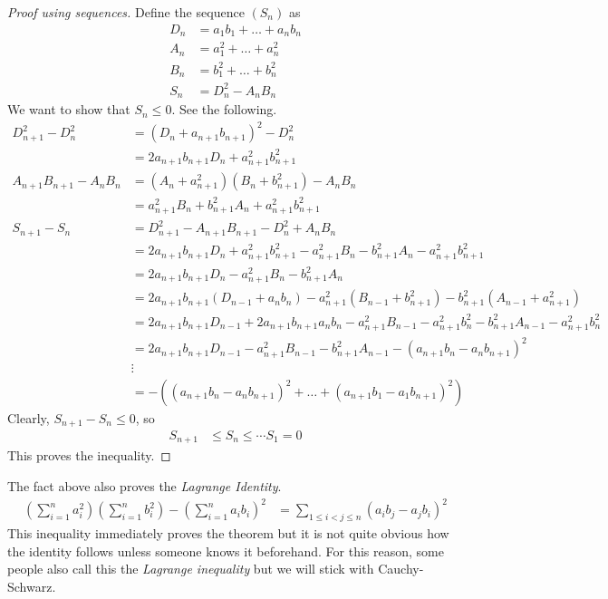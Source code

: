 \documentclass{subfile}
\begin{document}
		\begin{proof}[Proof using sequences]
			Define the sequence $(S_n)$ as
				\begin{align*}
					D_n
						& = a_1b_1+\ldots+a_nb_n\\
					A_n
						& = a_1^2+\ldots+a_n^2\\
					B_n
						& = b_1^2+\ldots+b_n^2\\
					S_n
						& = D_n^2-A_nB_n
				\end{align*}
			We want to show that $S_n\leq0$. See the following.
				\begin{align*}
					D_{n+1}^2-D_n^2
						& = (D_n+a_{n+1}b_{n+1})^2-D_n^2\\
						& = 2a_{n+1}b_{n+1}D_n+a_{n+1}^2b_{n+1}^2\\
					A_{n+1}B_{n+1}-A_nB_n
						& = (A_n+a_{n+1}^2)(B_n+b_{n+1}^2)-A_nB_n\\
						& = a_{n+1}^2B_n+b_{n+1}^2A_n+a_{n+1}^2b_{n+1}^2\\
					S_{n+1}-S_n
						& = D_{n+1}^2-A_{n+1}B_{n+1}-D_n^2+A_nB_n\\
						& = 2a_{n+1}b_{n+1}D_n+a_{n+1}^2b_{n+1}^2-a_{n+1}^2B_n-b_{n+1}^2A_n-a_{n+1}^2b_{n+1}^2\\
						& = 2a_{n+1}b_{n+1}D_n-a_{n+1}^2B_n-b_{n+1}^2A_n\\
						& = 2a_{n+1}b_{n+1}(D_{n-1}+a_nb_n)-a_{n+1}^2(B_{n-1}+b_{n+1}^2)-b_{n+1}^2(A_{n-1}+a_{n+1}^2)\\
						& = 2a_{n+1}b_{n+1}D_{n-1}+2a_{n+1}b_{n+1}a_nb_n-a_{n+1}^2B_{n-1}-a_{n+1}^2b_{n}^2-b_{n+1}^2A_{n-1}-a_{n+1}^2b_{n}^2\\
						& = 2a_{n+1}b_{n+1}D_{n-1}-a_{n+1}^2B_{n-1}-b_{n+1}^2A_{n-1}-(a_{n+1}b_n-a_{n}b_{n+1})^2\\
						& \vdots\\
						& = -\left((a_{n+1}b_n-a_nb_{n+1})^2+\ldots+(a_{n+1}b_1-a_1b_{n+1})^2\right)
				\end{align*}
			Clearly, $S_{n+1}-S_n\leq0$, so
				\begin{align*}
					S_{n+1}
						& \leq S_n\leq\cdots S_1=0
				\end{align*}
			This proves the inequality.
		\end{proof}
	The fact above also proves the \textit{Lagrange Identity}.
		\begin{align*}
			\left(\sum_{i=1}^na_i^2\right)\left(\sum_{i=1}^nb_i^2\right)-\left(\sum_{i=1}^na_ib_i\right)^2
				& = \sum_{1\leq i< j\leq n}(a_ib_j-a_jb_i)^2
		\end{align*}
	This inequality immediately proves the theorem but it is not quite obvious how the identity follows unless someone knows it beforehand. For this reason, some people also call this the \textit{Lagrange inequality} but we will stick with Cauchy-Schwarz. %
	
\end{document}
